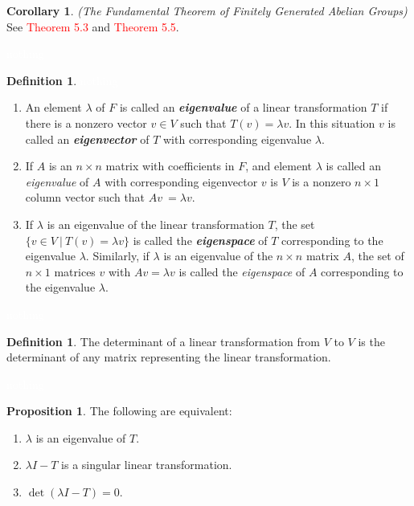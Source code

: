 \documentclass{article}
\theoremstyle{definition}
\newtheorem{prop}[thm]{Proposition}
\newtheorem{cor}[thm]{Corollary}
\newtheorem{defn}[thm]{Definition}
\newcommand{\nl}{\textcolor{white}{nothing}}
\begin{document}
\begin{cor}\textit{(The Fundamental Theorem of Finitely Generated Abelian Groups)}
See \textcolor{red}{Theorem 5.3} and \textcolor{red}{Theorem 5.5}.
\end{cor}

\nl

\begin{defn}\nl
\begin{enumerate}
\item An element $\lambda$ of $F$ is called an \textit{\textbf{eigenvalue}} of a linear transformation $T$ if there is a nonzero vector $v\in V$ such that $T(v) = \lambda v$. In this situation $v$ is called an \textit{\textbf{eigenvector}} of $T$ with corresponding eigenvalue $\lambda$.

\item If $A$ is an $n\times n$ matrix with coefficients in $F$, and element $\lambda$ is called an \textit{eigenvalue} of $A$ with corresponding eigenvector $v$ is $V$ is a nonzero $n\times 1$ column vector such that $Av\ = \lambda v$.

\item If $\lambda$ is an eigenvalue of the linear transformation $T$, the set $\{v\in V\ |\ T(v) = \lambda v\}$ is called the \textit{\textbf{eigenspace}} of $T$ corresponding to the eigenvalue $\lambda$. Similarly, if $\lambda$ is an eigenvalue of the $n\times n$ matrix $A$, the set of $n\times 1$ matrices $v$ with $Av = \lambda v$ is called the \textit{eigenspace} of $A$ corresponding to the eigenvalue $\lambda$.
\end{enumerate}
\end{defn}

\nl

\begin{defn}
The determinant of a linear transformation from $V$ to $V$ is the determinant of any matrix representing the linear transformation.
\end{defn}

\nl

\begin{prop}
The following are equivalent:
\begin{enumerate}
\item $\lambda$ is an eigenvalue of $T$.
\item $\lambda I - T$ is a singular linear transformation.
\item $\det(\lambda I - T) = 0$.
\end{enumerate}
\end{prop}
\end{document}
